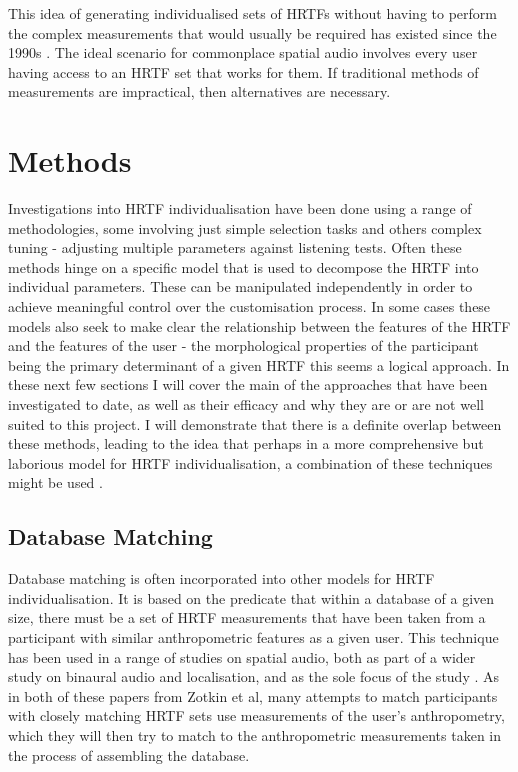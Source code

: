 This idea of generating individualised sets of HRTFs without having to perform the complex measurements that would usually be required has existed since the 1990s \citep{Kistler1992}. The ideal scenario for commonplace spatial audio involves every user having access to an HRTF set that works for them. If traditional methods of measurements are impractical, then alternatives are necessary.

\section{Methods}
Investigations into HRTF individualisation have been done using a range of methodologies, some involving just simple selection tasks \citep{Zotkin2002} and others complex tuning \citep{Tan1998} - adjusting multiple parameters against listening tests. Often these methods hinge on a specific model that is used to decompose the HRTF into individual parameters. These can be manipulated independently in order to achieve meaningful control over the customisation process. In some cases these models also seek to make clear the relationship between the features of the HRTF and the features of the user - the morphological properties of the participant being the primary determinant of a given HRTF this seems a logical approach. In these next few sections I will cover the main of the approaches that have been investigated to date, as well as their efficacy and why they are or are not well suited to this project. I will demonstrate that there is a definite overlap between these methods, leading to the idea that perhaps in a more comprehensive but laborious model for HRTF individualisation, a combination of these techniques might be used \citep{hoene2017}.

\subsection{Database Matching}
Database matching is often incorporated into other models for HRTF individualisation. It is based on the predicate that within a database of a given size, there must be a set of HRTF measurements that have been taken from a participant with similar anthropometric features as a given user. This technique has been used in a range of studies on spatial audio, both as part of a wider study on binaural audio and localisation, \citep{Zotkin2002} and as the sole focus of the study \citep{Zotkin}. As in both of these papers from Zotkin et al, many attempts to match participants with closely matching HRTF sets use measurements of the user's anthropometry, which they will then try to match to the anthropometric measurements taken in the process of assembling the database. 


